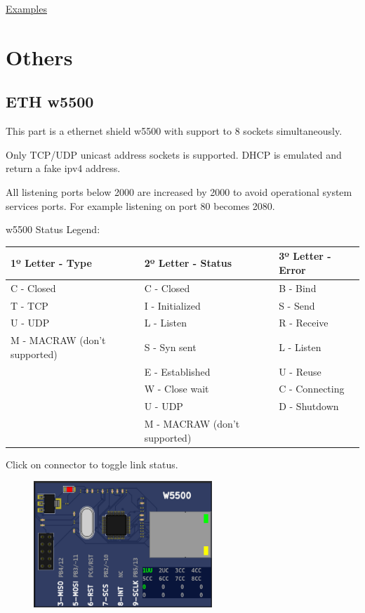 \href{https://lcgamboa.github.io/picsimlab_examples/Parts.html\#Step_Motor}{Examples}



\section{Others}


\subsection{ETH w5500}

This part is a ethernet shield w5500 with support to 8 sockets simultaneously.

Only TCP/UDP unicast address sockets is supported. 
DHCP is emulated and return a fake ipv4 address.

All listening ports below 2000 are increased by 2000 to avoid operational system services ports. 
For example listening on port 80 becomes 2080. 

w5500 Status Legend:
\begin{center}
\begin{tabular}{l|l|l}
\hline \textbf{1º Letter - Type} & \textbf{2º Letter - Status} & \textbf{3º Letter - Error}\\
\hline
\hline C - Closed & C - Closed & B - Bind\\
\hline T - TCP & I - Initialized & S - Send\\
\hline U - UDP & L - Listen & R - Receive\\
\hline M - MACRAW (don't supported) & S - Syn sent & L - Listen\\
\hline   & E - Established & U - Reuse\\
\hline   & W - Close wait & C - Connecting\\
\hline   & U - UDP & D - Shutdown\\
\hline   & M - MACRAW (don't supported) &   \\
\hline
\end{tabular}
\end{center}

Click on connector to toggle link status.

\begin{figure}[H]
\center
\includegraphics[width=0.6\textwidth]{img/part_w5500.png} 
\end{figure} 

